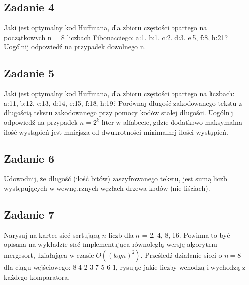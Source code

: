 \documentclass{article}
\begin{document}
\subsection*{Zadanie 4}
Jaki jest optymalny kod Huffmana, dla zbioru częstości opartego na początkowych n = 8
liczbach Fibonacciego: a:1, b:1, c:2, d:3, e:5, f:8, h:21?
Uogólnij odpowiedź na przypadek dowolnego n.

\subsection*{Zadanie 5}
Jaki jest optymalny kod Huffmana, dla zbioru częstości opartego na liczbach: a:11, b:12,
c:13, d:14, e:15, f:18, h:19? Porównaj długość zakodowanego tekstu z długością tekstu
zakodowanego przy pomocy kodów stałej długości.
Uogólnij odpowiedź na przypadek $n = 2^k$ liter w alfabecie, gdzie dodatkowo maksymalna
ilość wystąpień jest mniejsza od dwukrotności minimalnej ilości wystąpień.

\subsection*{Zadanie 6}
Udowodnij, że długość (ilość bitów) zaszyfrowanego tekstu, jest sumą liczb występujących w
wewnętrznych węzłach drzewa kodów (nie liściach).

\subsection*{Zadanie 7}
Narysuj na kartce sieć sortującą $n$ liczb dla $n$ = 2, 4, 8, 16. Powinna to być opisana na
wykładzie sieć implementująca równoległą wersję algorytmu mergesort, działająca w
czasie $O((log n)^2)$. Prześledź działanie sieci o $n = 8$ dla ciągu wejściowego: 8 4 2 3 7 5 6
1, rysując jakie liczby wchodzą i wychodzą z każdego komparatora.
\end{document}
